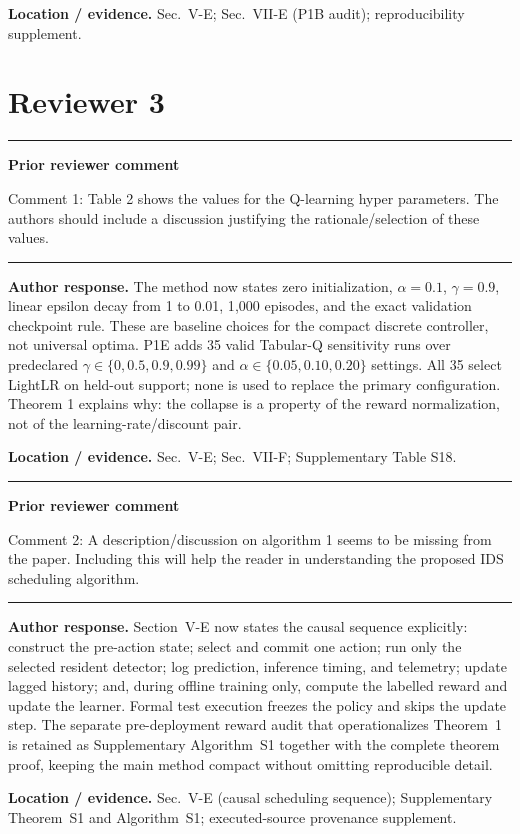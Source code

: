 \documentclass[11pt]{article}
\newenvironment{qbox}
    {\par\vspace{4pt}\noindent\begin{minipage}{\linewidth}\rule{\linewidth}{0.4pt}\par\noindent\textbf{Prior reviewer comment}\par\noindent}
    {\par\rule{\linewidth}{0.4pt}\end{minipage}\par\vspace{4pt}}
\begin{document}
\textbf{Location / evidence.} Sec.~V-E; Sec.~VII-E (P1B audit); reproducibility supplement.

\section*{Reviewer 3}

\begin{qbox}
Comment 1: Table 2 shows the values for the Q-learning hyper parameters. The authors should include a discussion justifying the rationale/selection of these values.
\end{qbox}

\textbf{Author response.} The method now states zero initialization, $\alpha=0.1$, $\gamma=0.9$, linear epsilon decay from 1 to 0.01, 1{,}000 episodes, and the exact validation checkpoint rule. These are baseline choices for the compact discrete controller, not universal optima. P1E adds 35 valid Tabular-Q sensitivity runs over predeclared $\gamma\in\{0, 0.5, 0.9, 0.99\}$ and $\alpha\in\{0.05, 0.10, 0.20\}$ settings. All 35 select LightLR on held-out support; none is used to replace the primary configuration. Theorem 1 explains why: the collapse is a property of the reward normalization, not of the learning-rate/discount pair.

\textbf{Location / evidence.} Sec.~V-E; Sec.~VII-F; Supplementary Table S18.

\begin{qbox}
Comment 2: A description/discussion on algorithm 1 seems to be missing from the paper. Including this will help the reader in understanding the proposed IDS scheduling algorithm.
\end{qbox}

\textbf{Author response.} Section~V-E now states the causal sequence explicitly: construct the pre-action state; select and commit one action; run only the selected resident detector; log prediction, inference timing, and telemetry; update lagged history; and, during offline training only, compute the labelled reward and update the learner. Formal test execution freezes the policy and skips the update step. The separate pre-deployment reward audit that operationalizes Theorem~1 is retained as Supplementary Algorithm~S1 together with the complete theorem proof, keeping the main method compact without omitting reproducible detail.

\textbf{Location / evidence.} Sec.~V-E (causal scheduling sequence); Supplementary Theorem~S1 and Algorithm~S1; executed-source provenance supplement.
\end{document}
